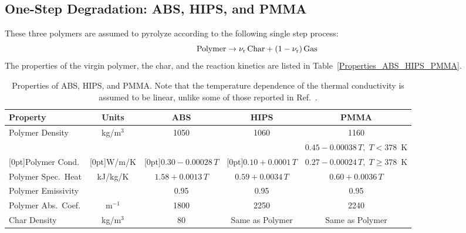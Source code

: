 \subsection{One-Step Degradation: ABS, HIPS, and PMMA}

These three polymers are assumed to pyrolyze according to the following single step process:
\begin{equation}
   \hbox{Polymer}  \to \nu_{\rm r} \, \hbox{Char} + (1-\nu_{\rm r}) \, \hbox{Gas}
\end{equation}
The properties of the virgin polymer, the char, and the reaction kinetics are listed in Table~\ref{Properties_ABS_HIPS_PMMA}.

\begin{table}[h!]
\caption[Properties of ABS, HIPS, and PMMA]{Properties of ABS, HIPS, and PMMA. Note that the temperature dependence of the thermal conductivity is assumed to be linear, unlike some of those reported in Ref.~\cite{Li:Thesis}.}
\centering
\begin{tabular*}{\textwidth}{|l|@{\extracolsep\fill}c@{\extracolsep\fill}|c|c|c|}
\hline
Property                    & Units         & ABS                     & HIPS                    & PMMA                     \\ \hline \hline
Polymer Density             & kg/m$^3$      & 1050                    & 1060                    & 1160                     \\ \hline
                            &               &                         &                         & $0.45-0.00038 \, T, \; T<378$~K      \\
\raisebox{1.5ex}[0pt]{Polymer Cond.}        & \raisebox{1.5ex}[0pt]{W/m/K}         & \raisebox{1.5ex}[0pt]{$0.30-0.00028 \, T$}  & \raisebox{1.5ex}[0pt]{$0.10+0.0001  \, T$} & $0.27-0.00024 \, T, \; T\ge 378$~K  \\ \hline
Polymer Spec.~Heat          & kJ/kg/K       & $1.58+0.0013  \, T$     & $0.59+0.0034  \, T$     & $0.60+0.0036  \, T$      \\ \hline
Polymer Emissivity          &               & 0.95                    & 0.95                    & 0.95                     \\ \hline
Polymer Abs.~Coef.          & m$^{-1}$      & 1800                    & 2250                    & 2240                     \\ \hline
Char Density                & kg/m$^3$      & 80                      & Same as Polymer         & Same as Polymer          \\ \hline

\end{tabular*}
\end{table}
